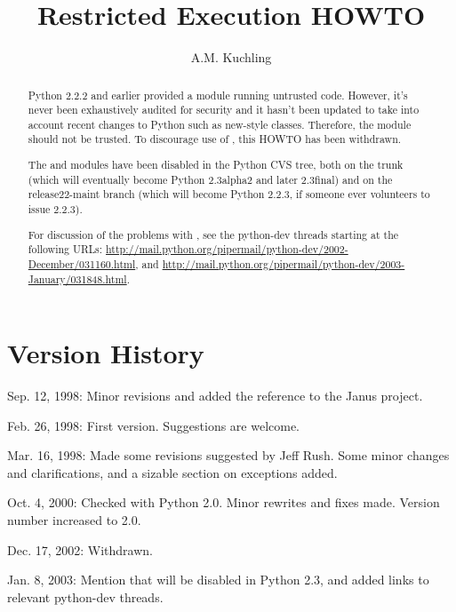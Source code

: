 \documentclass{howto}
\title{Restricted Execution HOWTO}
\author{A.M. Kuchling}
\begin{document}
\maketitle

\begin{abstract}
\noindent

Python 2.2.2 and earlier provided a  module running
untrusted code.  However, it's never been exhaustively audited for
security and it hasn't been updated to take into account recent
changes to Python such as new-style classes. Therefore, the
 module should not be trusted.  To discourage use of 
, this HOWTO has been withdrawn.

The  and  modules have been disabled in
the Python CVS tree, both on the trunk (which will eventually become
Python 2.3alpha2 and later 2.3final) and on the release22-maint branch
(which will become Python 2.2.3, if someone ever volunteers to issue
2.2.3).

For discussion of the problems with , see the python-dev
threads starting at the following URLs:
\url{http://mail.python.org/pipermail/python-dev/2002-December/031160.html},
and
\url{http://mail.python.org/pipermail/python-dev/2003-January/031848.html}.

\end{abstract}


\section{Version History}

Sep. 12, 1998: Minor revisions and added the reference to the Janus
project.

Feb. 26, 1998: First version.  Suggestions are welcome.

Mar. 16, 1998: Made some revisions suggested by Jeff Rush.  Some minor
changes and clarifications, and a sizable section on exceptions added.

Oct. 4, 2000: Checked with Python 2.0.  Minor rewrites and fixes made.
Version number increased to 2.0.

Dec. 17, 2002: Withdrawn.

Jan. 8, 2003: Mention that  will be disabled in Python 2.3,
and added links to relevant python-dev threads.
\end{document}
